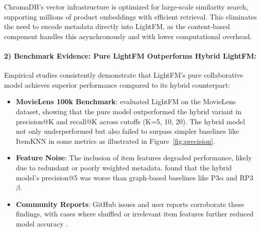 ChromaDB's vector infrastructure is optimized for large-scale similarity search, supporting millions of product embeddings with efficient retrieval. This eliminates the need to encode metadata directly into LightFM, as the content-based component handles this asynchronously and with lower computational overhead.

\paragraph{2) Benchmark Evidence: Pure LightFM Outperforms Hybrid LightFM:}
Empirical studies consistently demonstrate that LightFM's pure collaborative model achieves superior performance compared to its hybrid counterpart:
\begin{itemize}
    \item \textbf{MovieLens 100k Benchmark}: \cite{shu2023lightfm} evaluated LightFM on the MovieLens dataset, showing that the pure model outperformed the hybrid variant in precision@K and recall@K across cutoffs (K=5, 10, 20). The hybrid model not only underperformed but also failed to surpass simpler baselines like ItemKNN in some metrics as illustrated in Figure~\ref{fig:precision}.

    \item \textbf{Feature Noise}: The inclusion of item features degraded performance, likely due to redundant or poorly weighted metadata. \cite{shu2023lightfm} found that the hybrid model's precision@5 was worse than graph-based baselines like P3$\alpha$ and RP3$\beta$.
    \item \textbf{Community Reports}: GitHub issues and user reports corroborate these findings, with cases where shuffled or irrelevant item features further reduced model accuracy \cite{lightfm_issues}.
\end{itemize}
